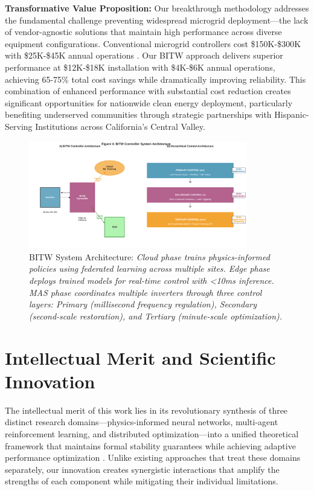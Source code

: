 \documentclass[12pt]{article}
\begin{document}
\textbf{Transformative Value Proposition:} Our breakthrough methodology addresses the fundamental challenge preventing widespread microgrid deployment---the lack of vendor-agnostic solutions that maintain high performance across diverse equipment configurations. Conventional microgrid controllers cost \$150K-\$300K with \$25K-\$45K annual operations \cite{hirsch2018,sigrin2019}. Our BITW approach delivers superior performance at \$12K-\$18K installation with \$4K-\$6K annual operations, achieving 65-75\% total cost savings while dramatically improving reliability. This combination of enhanced performance with substantial cost reduction creates significant opportunities for nationwide clean energy deployment, particularly benefiting underserved communities through strategic partnerships with Hispanic-Serving Institutions across California's Central Valley.

\begin{figure}[H]
\centering
\includegraphics[width=0.85\textwidth]{figure3_system_architecture.pdf}
\caption{BITW System Architecture: \textit{Cloud phase trains physics-informed policies using federated learning across multiple sites. Edge phase deploys trained models for real-time control with <10ms inference. MAS phase coordinates multiple inverters through three control layers: Primary (millisecond frequency regulation), Secondary (second-scale restoration), and Tertiary (minute-scale optimization).}}
\end{figure}

\section{Intellectual Merit and Scientific Innovation}

The intellectual merit of this work lies in its revolutionary synthesis of three distinct research domains---physics-informed neural networks, multi-agent reinforcement learning, and distributed optimization---into a unified theoretical framework that maintains formal stability guarantees while achieving adaptive performance optimization \cite{bevrani2021,palizban2014}. Unlike existing approaches that treat these domains separately, our innovation creates synergistic interactions that amplify the strengths of each component while mitigating their individual limitations.
\end{document}

